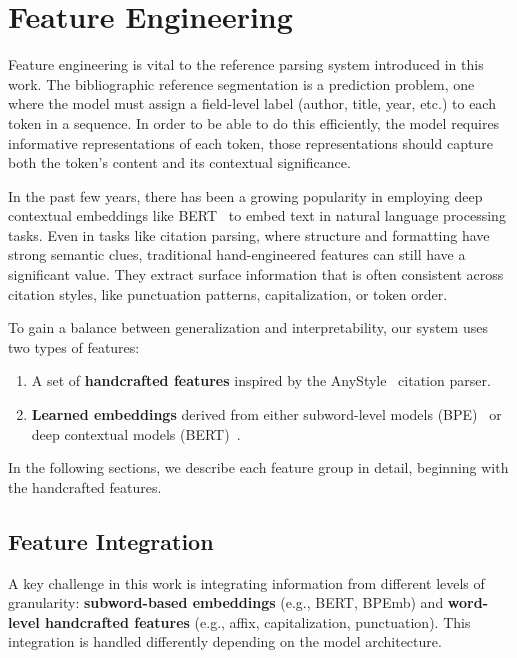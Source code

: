 \section{Feature Engineering}

Feature engineering is vital to the reference parsing system introduced in this work. The bibliographic reference segmentation is a prediction problem, one where the model must assign a field-level label (author, title, year, etc.) to each token in a sequence. In order to be able to do this efficiently, the model requires informative representations of each token, those representations should capture both the token’s content and its contextual significance.

In the past few years, there has been a growing popularity in employing deep contextual embeddings like BERT~\cite{2019-bert} to embed text in natural language processing tasks. Even in tasks like citation parsing, where structure and formatting have strong semantic clues, traditional hand-engineered features can still have a significant value. They extract surface information that is often consistent across citation styles, like punctuation patterns, capitalization, or token order.

To gain a balance between generalization and interpretability, our system uses two types of features:
\begin{enumerate}
\item A set of \textbf{handcrafted features} inspired by the AnyStyle~\cite{anystyle} citation parser.
\item \textbf{Learned embeddings} derived from either subword-level models (BPE)~\cite{bpemb} or deep contextual models (BERT)~\cite{2019-bert}.
\end{enumerate}
In the following sections, we describe each feature group in detail, beginning with the handcrafted features.


\clearpage


\clearpage

\subsection{Feature Integration}
A key challenge in this work is integrating information from different levels of granularity: \textbf{subword-based embeddings} (e.g., BERT, BPEmb) and \textbf{word-level handcrafted features} (e.g., affix, capitalization, punctuation). This integration is handled differently depending on the model architecture.


